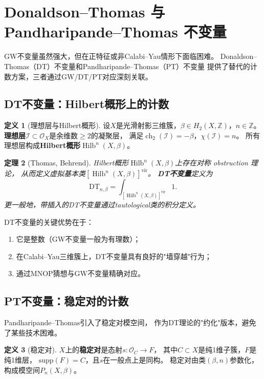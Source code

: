 \documentclass[11pt,a4paper]{article}
\theoremstyle{plain}
\newtheorem{theorem}{定理}[section]
\theoremstyle{definition}
\newtheorem{definition}[theorem]{定义}
\newcommand{\Z}{\mathbb{Z}}
\newcommand{\Ocal}{\mathcal{O}}
\newcommand{\Ical}{\mathcal{I}}
\newcommand{\ch}{\operatorname{ch}}
\newcommand{\Hilb}{\operatorname{Hilb}}
\newcommand{\DTinv}{\mathrm{DT}}
\begin{document}
\section{Donaldson--Thomas 与 Pandharipande--Thomas 不变量}\label{sec:dt}

GW不变量虽然强大，但在正特征或非Calabi--Yau情形下面临困难。
Donaldson--Thomas（DT）不变量和Pandharipande--Thomas（PT）不变量
提供了替代的计数方案，三者通过GW/DT/PT对应深刻关联。

\subsection{DT不变量：Hilbert概形上的计数}

\begin{definition}[理想层与Hilbert概形]\label{def:hilb}
设$X$是光滑射影三维簇，$\beta \in H_2(X, \Z)$，$n \in \Z$。
\textbf{理想层}$\Ical \subset \Ocal_X$是余维数$\geq 2$的凝聚层，
满足$\ch_2(\Ical) = -\beta$，$\chi(\Ical) = n$。
所有理想层构成\textbf{Hilbert概形}$\Hilb^n(X, \beta)$。
\end{definition}

\begin{theorem}[Thomas, Behrend]\label{thm:dt}
Hilbert概形$\Hilb^n(X, \beta)$上存在对称 obstruction 理论，
从而定义虚拟基本类$[\Hilb^n(X,\beta)]^{\mathrm{vir}}$。
\textbf{DT不变量}定义为
\[
\DTinv_{n,\beta} = \int_{[\Hilb^n(X,\beta)]^{\mathrm{vir}}} 1.
\]
更一般地，带插入的DT不变量通过tautological类的积分定义。
\end{theorem}

DT不变量的关键优势在于：
\begin{enumerate}[label=(\arabic*)]
\item 它是整数（GW不变量一般为有理数）；
\item 在Calabi--Yau三维簇上，DT不变量具有良好的"墙穿越"行为；
\item 通过MNOP猜想\cite{MNOP2006}与GW不变量精确对应。
\end{enumerate}

\subsection{PT不变量：稳定对的计数}

Pandharipande--Thomas引入了稳定对模空间，
作为DT理论的"约化"版本，避免了某些技术困难。

\begin{definition}[稳定对]\label{def:pt}
$X$上的\textbf{稳定对}是态射$s: \Ocal_C \to F$，
其中$C \subset X$是纯1维子簇，$F$是纯1维层，
$\mathrm{supp}(F) = C$，且$s$在一般点上是同构。
稳定对由类$(\beta, n)$参数化，构成模空间$P_n(X, \beta)$。
\end{definition}
\end{document}
